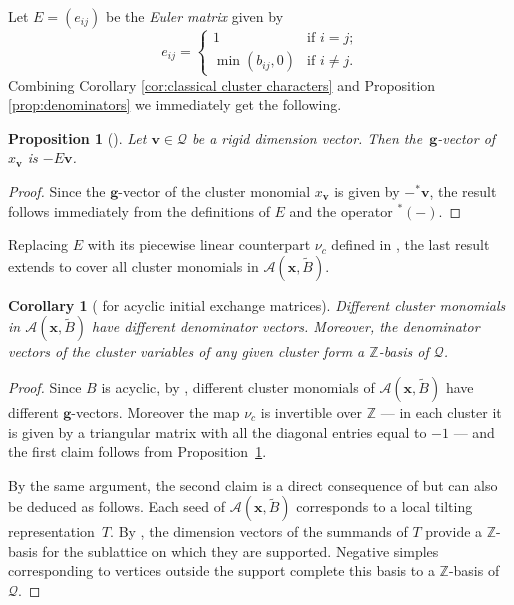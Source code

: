 \documentclass[pdftex]{sigma}
\newcommand{\bfg}{\mathbf{g}}
\newcommand{\bfv}{\mathbf{v}}
\newcommand{\bfx}{\mathbf{x}}
\newcommand{\cA}{\mathcal{A}}
\newcommand{\cQ}{\mathcal{Q}}
\newcommand{\ZZ}{\mathbb{Z}}
\newtheorem{Corollary}[Theorem]{Corollary}
\newtheorem{Proposition}[Theorem]{Proposition}
 { \theoremstyle{definition}
\newtheorem{Definition}[Theorem]{Definition}
\newtheorem{Note}[Theorem]{Note}
\newtheorem{Example}[Theorem]{Example}
\newtheorem{Remark}[Theorem]{Remark} }
\begin{document}
  Let $E=(e_{ij})$ be the \emph{Euler matrix} given by
  \[
    e_{ij}
    =
    \begin{cases} 
      1 & \text{if $i=j$;}\\ 
      \min(b_{ij},0) & \text{if $i\ne j$.}
    \end{cases}
  \]
  Combining Corollary \ref{cor:classical cluster characters} and Proposition \ref{prop:denominators} we immediately get the following.
  \begin{Proposition}[{\cite[Conjecture 3.21]{reading-speyer}}]
    \label{prop:d to g}
    Let $\bfv\in\cQ$ be a rigid dimension vector.
    Then the~$\bfg$-vector of $x_\bfv$ is $-E\bfv$.
  \end{Proposition}
  \begin{proof}
    Since the $\bfg$-vector of the cluster monomial $x_\bfv$ is given by $-{}^*\bfv$, the result follows immediately from the definitions of $E$ and the operator ${}^*(-)$.
  \end{proof}
  Replacing $E$ with its piecewise linear counterpart $\nu_c$ defined in \cite{reading-stella-2}, the last result extends to cover all cluster monomials in $\cA(\bfx,\widetilde{B})$.

  \begin{Corollary}[{\cite[Conjecture 7.6]{fomin-zelevinsky4}} for acyclic initial exchange matrices]
    \label{cor:d_vect basis}
    Different cluster monomials in $\cA(\bfx,\widetilde{B})$ have different denominator vectors.
    Moreover, the denominator vectors of the cluster variables of any given cluster form a $\ZZ$-basis of $\cQ$.
  \end{Corollary}
  \begin{proof}
    Since $B$ is acyclic, by \cite[Remark 7.2 and Proposition 11.6]{demonet2}, different cluster monomials of $\cA(\bfx,\widetilde{B})$ have different $\bfg$-vectors.
    Moreover the map $\nu_c$ is invertible over $\ZZ$ --- in each cluster it is given by a triangular matrix with all the diagonal entries equal to $-1$ --- and the first claim follows from Proposition~\ref{prop:d to g}.

    By the same argument, the second claim is a direct consequence of \cite[Proposition 11.5]{demonet2} but can also be deduced as follows.
    Each seed of $\cA(\bfx,\widetilde{B})$ corresponds to a local tilting representation~$T$.
    By \cite[Lemma 4.3 and Theorem 4.5]{happel-ringel}, the dimension vectors of the summands of $T$ provide a $\ZZ$-basis for the sublattice on which they are supported.
    Negative simples corresponding to vertices outside the support complete this basis to a $\ZZ$-basis of $\cQ$.
  \end{proof}
\end{document}
